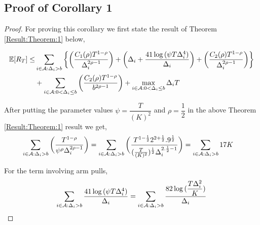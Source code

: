 \subsection{Proof of Corollary 1}
\label{sec:proofTheorem:Corollary1}
\begin{proof}
\label{Proof:Corollary:1}
For proving this corollary we first state the result of Theorem \ref{Result:Theorem:1} below, 
	
\begin{align*}
\mathbb{E} [R_{T}] \leq &\sum\limits_{i\in \mathcal{A} :\Delta_{i} > b}\bigg\lbrace\bigg(\dfrac{C_{1}(\rho)T^{1-\rho}}{\Delta_{i}^{2\rho -1}}\bigg) + \bigg(\Delta_{i}+\dfrac{41\log{(\psi  T\Delta_{i}^{4})}}{\Delta_{i}}\bigg) + \bigg(\dfrac{ C_{2}(\rho) T^{1-\rho}}{\Delta_{i}^{2\rho-1}} \bigg)\bigg \rbrace\\ 
  & +\sum\limits_{i\in \mathcal{A} :0 < \Delta_{i}\leq b}\bigg(\dfrac{C_{2}(\rho)T^{1-\rho}}{b^{2\rho -1}} \bigg) + \max_{i\in \mathcal{A} :0 < \Delta_{i}\leq b}\Delta_{i}T
\end{align*} 


After putting the parameter values $\psi=\dfrac{T}{(K)^2}$ and $\rho=\dfrac{1}{2}$ in the above Theorem \ref{Result:Theorem:1} result we get,
	\begin{align*}
	\sum_{i\in \mathcal{A} :\Delta_{i} > b}\bigg(\dfrac{T^{1-\rho}}{\psi^{\rho}\Delta_{i}^{2\rho -1}} \bigg) &= \sum_{i\in \mathcal{A} :\Delta_{i} > b}\bigg(\dfrac{T^{1-\frac{1}{2}}2^{2+\frac{1}{2}}.9^{\frac{1}{2}}}{(\frac{T}{( K)^2})^{\frac{1}{2}}\Delta_{i}^{2.\frac{1}{2}-1}} \bigg) = \sum_{i\in \mathcal{A} :\Delta_{i} > b} 17 K 
	\end{align*}
	
	
	For the term involving arm pulls,
	\begin{align*}
	\sum_{i\in \mathcal{A} :\Delta_{i} > b}\dfrac{41\log{(\psi T\Delta_{i}^{4})}}{\Delta_{i}}=\sum_{i\in \mathcal{A} :\Delta_{i} > b}\dfrac{82\log{(\dfrac{T\Delta_{i}^{2}}{K})}}{\Delta_{i}}
	\end{align*}		


\end{proof}
